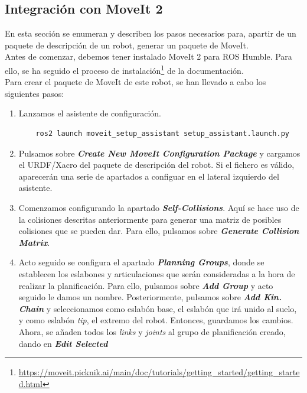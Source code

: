 \newpage
\subsection{Integración con MoveIt 2}
\noindent En esta sección se enumeran y describen los pasos necesarios para, apartir de un paquete de descripción de un robot, generar 
un paquete de MoveIt.
\\
Antes de comenzar, debemos tener instalado MoveIt 2 para ROS Humble. Para ello, se ha seguido el proceso de 
instalación\footnote{\url{https://moveit.picknik.ai/main/doc/tutorials/getting_started/getting_started.html}} de la documentación.
\\

Para crear el paquete de MoveIt de este robot, se han llevado a cabo los siguientes pasos:
\begin{enumerate}
\item Lanzamos el asistente de configuración.
\begin{verbatim}
    ros2 launch moveit_setup_assistant setup_assistant.launch.py
\end{verbatim}
\item Pulsamos sobre \textbf{\textit{\guillemotleft Create New MoveIt Configuration Package\guillemotright}} y cargamos el URDF/Xacro del paquete de descripción 
del robot. Si el fichero es válido, aparecerán una serie de apartados a configuar en el lateral izquierdo del asistente. 
\item Comenzamos configurando la apartado \textbf{\textit{\guillemotleft Self-Collisions\guillemotright}}. Aquí se hace uso de la colisiones 
descritas anteriormente para generar una matriz de posibles colisiones que se pueden dar. Para ello, pulsamos sobre
\textbf{\textit{\guillemotleft Generate Collision Matrix\guillemotright}}.
\item Acto seguido se configura el apartado \textbf{\textit{\guillemotleft Planning Groups\guillemotright}}, donde se establecen los eslabones y articulaciones que serán consideradas 
a la hora de realizar la planificación. Para ello, pulsamos sobre \textbf{\textit{\guillemotleft Add Group\guillemotright}} y acto seguido 
le damos un nombre. Posteriormente, pulsamos sobre \textbf{\textit{\guillemotleft Add Kin. Chain\guillemotright}} y seleccionamos como 
eslabón base, el eslabón que irá unido al suelo, y como eslabón \textit{tip}, el extremo del robot. Entonces, guardamos los cambios. Ahora, 
se añaden todos los \textit{links} y \textit{joints} al grupo de planificación creado, dando en \textbf{\textit{\guillemotleft Edit Selected\guillemotright}} 


\end{enumerate}
